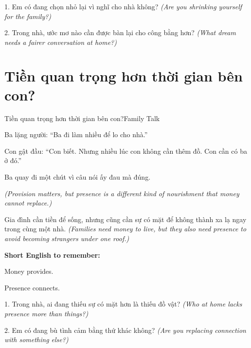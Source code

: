 \begin{tuhocnhanh}
1. Em có đang chọn nhỏ lại vì nghĩ cho nhà không? \textit{(Are you shrinking yourself for the family?)}

2. Trong nhà, ước mơ nào cần được bàn lại cho công bằng hơn? \textit{(What dream needs a fairer conversation at home?)}
\end{tuhocnhanh}
\ngancach

\section{Tiền quan trọng hơn thời gian bên con?}
\begin{truyen}{Tiền quan trọng hơn thời gian bên con?}{Family Talk}

Ba lặng người: ``Ba đi làm nhiều để lo cho nhà.''

Con gật đầu: ``Con biết. Nhưng nhiều lúc con không cần thêm đồ. Con cần có ba ở đó.''

Ba quay đi một chút vì câu nói ấy đau mà đúng.

\textit{(Provision matters, but presence is a different kind of nourishment that money cannot replace.)}
\end{truyen}

\begin{baihoc}
Gia đình cần tiền để sống, nhưng cũng cần sự có mặt để không thành xa lạ ngay trong cùng một nhà.
\textit{(Families need money to live, but they also need presence to avoid becoming strangers under one roof.)}
\end{baihoc}

\begin{ghinhoanh}
\textbf{Short English to remember:}

Money provides.

Presence connects.
\end{ghinhoanh}

\begin{tuhocnhanh}
1. Trong nhà, ai đang thiếu sự có mặt hơn là thiếu đồ vật? \textit{(Who at home lacks presence more than things?)}

2. Em có đang bù tình cảm bằng thứ khác không? \textit{(Are you replacing connection with something else?)}
\end{tuhocnhanh}
\ngancach

